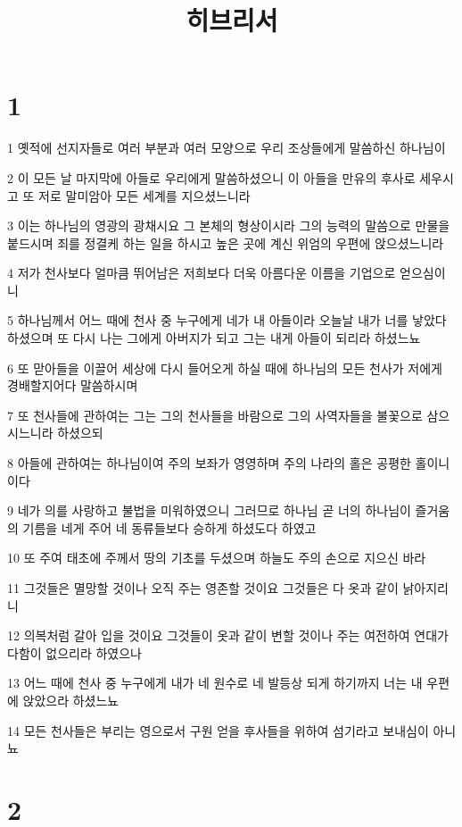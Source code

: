 

\title{히브리서}


\chapter{1}

\par 1 옛적에 선지자들로 여러 부분과 여러 모양으로 우리 조상들에게 말씀하신 하나님이
\par 2 이 모든 날 마지막에 아들로 우리에게 말씀하셨으니 이 아들을 만유의 후사로 세우시고 또 저로 말미암아 모든 세계를 지으셨느니라
\par 3 이는 하나님의 영광의 광채시요 그 본체의 형상이시라 그의 능력의 말씀으로 만물을 붙드시며 죄를 정결케 하는 일을 하시고 높은 곳에 계신 위엄의 우편에 앉으셨느니라
\par 4 저가 천사보다 얼마큼 뛰어남은 저희보다 더욱 아름다운 이름을 기업으로 얻으심이니
\par 5 하나님께서 어느 때에 천사 중 누구에게 네가 내 아들이라 오늘날 내가 너를 낳았다 하셨으며 또 다시 나는 그에게 아버지가 되고 그는 내게 아들이 되리라 하셨느뇨
\par 6 또 맏아들을 이끌어 세상에 다시 들어오게 하실 때에 하나님의 모든 천사가 저에게 경배할지어다 말씀하시며
\par 7 또 천사들에 관하여는 그는 그의 천사들을 바람으로 그의 사역자들을 불꽃으로 삼으시느니라 하셨으되
\par 8 아들에 관하여는 하나님이여 주의 보좌가 영영하며 주의 나라의 홀은 공평한 홀이니이다
\par 9 네가 의를 사랑하고 불법을 미워하였으니 그러므로 하나님 곧 너의 하나님이 즐거움의 기름을 네게 주어 네 동류들보다 승하게 하셨도다 하였고
\par 10 또 주여 태초에 주께서 땅의 기초를 두셨으며 하늘도 주의 손으로 지으신 바라
\par 11 그것들은 멸망할 것이나 오직 주는 영존할 것이요 그것들은 다 옷과 같이 낡아지리니
\par 12 의복처럼 갈아 입을 것이요 그것들이 옷과 같이 변할 것이나 주는 여전하여 연대가 다함이 없으리라 하였으나
\par 13 어느 때에 천사 중 누구에게 내가 네 원수로 네 발등상 되게 하기까지 너는 내 우편에 앉았으라 하셨느뇨
\par 14 모든 천사들은 부리는 영으로서 구원 얻을 후사들을 위하여 섬기라고 보내심이 아니뇨

\chapter{2}

